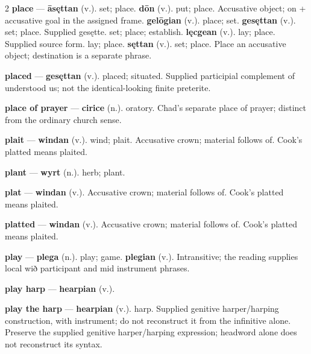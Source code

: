 \begin{multicols}{2}
\textbf{place} — \textbf{āsęttan} (v.). set; place. \textbf{dōn} (v.). put; place. Accusative object; on + accusative goal in the assigned frame. \textbf{gelōgian} (v.). place; set. \textbf{gesęttan} (v.). set; place. Supplied gesętte. set; place; establish. \textbf{lęcgean} (v.). lay; place. Supplied source form. lay; place. \textbf{sęttan} (v.). set; place. Place an accusative object; destination is a separate phrase.\par
\textbf{placed} — \textbf{gesęttan} (v.). placed; situated. Supplied participial complement of understood us; not the identical-looking finite preterite.\par
\textbf{place of prayer} — \textbf{cirice} (n.). oratory. Chad's separate place of prayer; distinct from the ordinary church sense.\par
\textbf{plait} — \textbf{windan} (v.). wind; plait. Accusative crown; material follows of. Cook's platted means plaited.\par
\textbf{plant} — \textbf{wyrt} (n.). herb; plant.\par
\textbf{plat} — \textbf{windan} (v.). Accusative crown; material follows of. Cook's platted means plaited.\par
\textbf{platted} — \textbf{windan} (v.). Accusative crown; material follows of. Cook's platted means plaited.\par
\textbf{play} — \textbf{plega} (n.). play; game. \textbf{plegian} (v.). Intransitive; the reading supplies local wið participant and mid instrument phrases.\par
\textbf{play harp} — \textbf{hearpian} (v.).\par
\textbf{play the harp} — \textbf{hearpian} (v.). harp. Supplied genitive harper/harping construction, with instrument; do not reconstruct it from the infinitive alone. Preserve the supplied genitive harper/harping expression; headword alone does not reconstruct its syntax.\par

\end{multicols}
